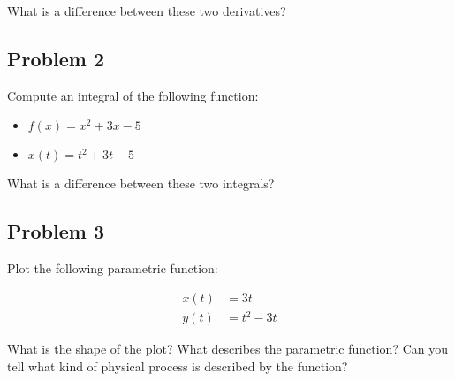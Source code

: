 \documentclass[11pt]{article}
\begin{document}
What is a difference between these two derivatives?

\subsection*{Problem 2}

Compute an integral of the following function:

\begin{itemize}
    \item $f(x) = x^2 + 3x - 5$
    \item $x(t) = t^2 + 3t - 5$
\end{itemize}

What is a difference between these two integrals?

\subsection*{Problem 3}

Plot the following parametric function:

\begin{align*}
 x(t) &= 3t \\
 y(t) &= t^2 - 3t
\end{align*}

What is the shape of the plot?
What describes the parametric function?
Can you tell what kind of physical process is described by the function?
\end{document}
